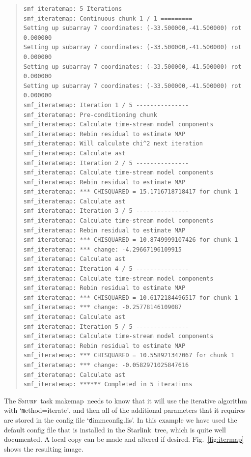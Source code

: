 \documentclass[twoside,11pt]{article}
\newenvironment{myquote}{\begin{quote}\begin{small}}{\end{small}\end{quote}}
\newcommand{\starlink}{\htmladdnormallink{Starlink}{http://star-www.rl.ac.uk/}}
\newcommand{\smurf}{\xref{\textsc{Smurf}}{sun258}{}}
\newcommand{\task}[1]{\textsf{#1}}
\newcommand{\makemap}{\xref{\task{makemap}}{sun258}{MAKEMAP}}
\newcommand{\htmladdnormallink}[2]{#1}
\newcommand{\xref}[3]{#1}
\renewcommand{\_}{\texttt{\symbol{95}}}
\begin{document}
\begin{myquote}
\begin{verbatim}
smf_iteratemap: 5 Iterations
smf_iteratemap: Continuous chunk 1 / 1 =========
Setting up subarray 7 coordinates: (-33.500000,-41.500000) rot 0.000000
Setting up subarray 7 coordinates: (-33.500000,-41.500000) rot 0.000000
Setting up subarray 7 coordinates: (-33.500000,-41.500000) rot 0.000000
Setting up subarray 7 coordinates: (-33.500000,-41.500000) rot 0.000000
smf_iteratemap: Iteration 1 / 5 ---------------
smf_iteratemap: Pre-conditioning chunk
smf_iteratemap: Calculate time-stream model components
smf_iteratemap: Rebin residual to estimate MAP
smf_iteratemap: Will calculate chi^2 next iteration
smf_iteratemap: Calculate ast
smf_iteratemap: Iteration 2 / 5 ---------------
smf_iteratemap: Calculate time-stream model components
smf_iteratemap: Rebin residual to estimate MAP
smf_iteratemap: *** CHISQUARED = 15.1716718718417 for chunk 1
smf_iteratemap: Calculate ast
smf_iteratemap: Iteration 3 / 5 ---------------
smf_iteratemap: Calculate time-stream model components
smf_iteratemap: Rebin residual to estimate MAP
smf_iteratemap: *** CHISQUARED = 10.8749999107426 for chunk 1
smf_iteratemap: *** change: -4.29667196109915
smf_iteratemap: Calculate ast
smf_iteratemap: Iteration 4 / 5 ---------------
smf_iteratemap: Calculate time-stream model components
smf_iteratemap: Rebin residual to estimate MAP
smf_iteratemap: *** CHISQUARED = 10.6172184496517 for chunk 1
smf_iteratemap: *** change: -0.25778146109087
smf_iteratemap: Calculate ast
smf_iteratemap: Iteration 5 / 5 ---------------
smf_iteratemap: Calculate time-stream model components
smf_iteratemap: Rebin residual to estimate MAP
smf_iteratemap: *** CHISQUARED = 10.558921347067 for chunk 1
smf_iteratemap: *** change: -0.0582971025847616
smf_iteratemap: Calculate ast
smf_iteratemap: ****** Completed in 5 iterations
\end{verbatim}
\end{myquote}

The \smurf\ task \makemap\ needs to know that it will use the
iterative algorithm with `{\texttt method=iterate}', and then all of
the additional parameters that it requires are stored in the config
file `{\texttt dimmconfig.lis}'. In this example we have used the
default config file that is installed in the \starlink\ tree, which is
quite well documented. A local copy can be made and altered if
desired. Fig.~\ref{fig:itermap} shows the resulting image.
\end{document}
